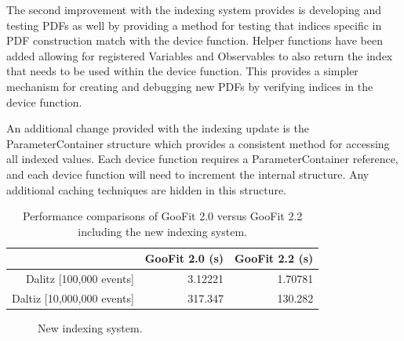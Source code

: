 \documentclass{webofc}
\begin{document}
The second improvement with the indexing system provides is developing and testing PDFs as well by providing a method for testing that indices specific in PDF construction match with the device function. Helper functions have been added allowing for registered Variables and Observables to also return the index that needs to be used within the device function. This provides a simpler mechanism for creating and debugging new PDFs by verifying indices in the device function. 

An additional change provided with the indexing update is the ParameterContainer structure which provides a consistent method for accessing all indexed values. Each device function requires a ParameterContainer reference, and each device function will need to increment the internal structure. Any additional caching techniques are hidden in this structure.

\begin{table}
	\centering
	\begin{tabular}{ |r|r|r| }
		\hline
			 & GooFit 2.0 (s) & GooFit 2.2 (s) \\
		\hline
			Dalitz [100,000 events] & 3.12221 & 1.70781 \\
		\hline
			Daltiz [10,000,000 events] & 317.347 & 130.282 \\
		\hline
	\end{tabular}
	\caption{Performance comparisons of GooFit 2.0 versus GooFit 2.2 including the new indexing system.}
	\label{table:1}
\end{table}

\begin{figure}
	\label{figure-newindexspeed}
	\caption{New indexing system.}
\end{figure}
\end{document}

